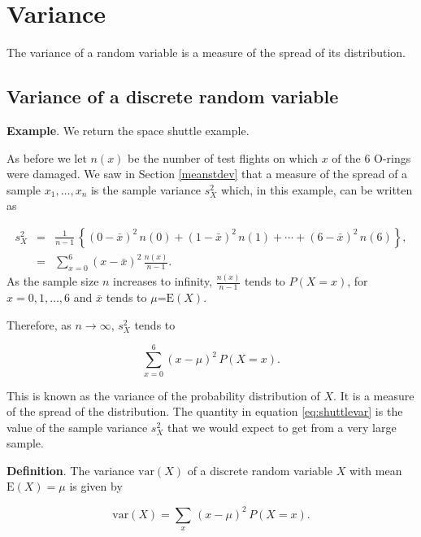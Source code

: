 \documentclass[
  11pt,
  british,
  openany, a4paper]{book}
\begin{document}
\hypertarget{variance}{%
\section{Variance}\label{variance}}

The variance of a random variable is a measure of the spread of its distribution.

\hypertarget{variance-of-a-discrete-random-variable}{%
\subsection{Variance of a discrete random variable}\label{variance-of-a-discrete-random-variable}}

\textbf{Example}. We return the space shuttle example.

As before we let \(n(x)\) be the number of test flights on which \(x\) of the 6 O-rings were damaged. We saw in Section \ref{meanstdev} that a measure of the spread of a sample \(x_1,\ldots,x_n\) is the sample variance \(s_X^2\) which, in this example, can be written as

\begin{eqnarray*}
s_X^2 &=& \frac{1}{n-1}\,\left\{
(0-\bar{x})^2\,n(0)+(1-\bar{x})^2\,n(1)+\cdots+(6-\bar{x})^2\,n(6) \right\},
\\
      &=& \sum_{x=0}^6 (x-\bar{x})^2\,\frac{n(x)}{n-1}. 
\end{eqnarray*}
As the sample size \(n\) increases to infinity, \(\frac{n(x)}{n-1}\) tends to \(P(X=x)\), for \(x=0,1,\ldots,6\) and \(\bar{x}\) tends to \(\mu\)=\(\mathrm{E}(X)\).

Therefore, as \(n \rightarrow \infty\), \(s_X^2\) tends to

\begin{equation}
\sum_{x=0}^6 (x-\mu)^2\,P(X=x). 
\label{eq:shuttlevar}
\end{equation}

This is known as the variance of the probability distribution of \(X\). It is a measure of the spread of the distribution. The quantity in equation \eqref{eq:shuttlevar} is the value of the sample variance \(s_X^2\) that we would expect to get from a very large sample.

\textbf{Definition}. The variance \(\mathrm{var}(X)\) of a discrete random variable \(X\) with mean \(\mathrm{E}(X)=\mu\) is given by

\begin{equation}
\mathrm{var}(X) = \sum_x\,(x-\mu)^2\,P(X=x). 
\label{eq:varidisc}
\end{equation}
\end{document}
